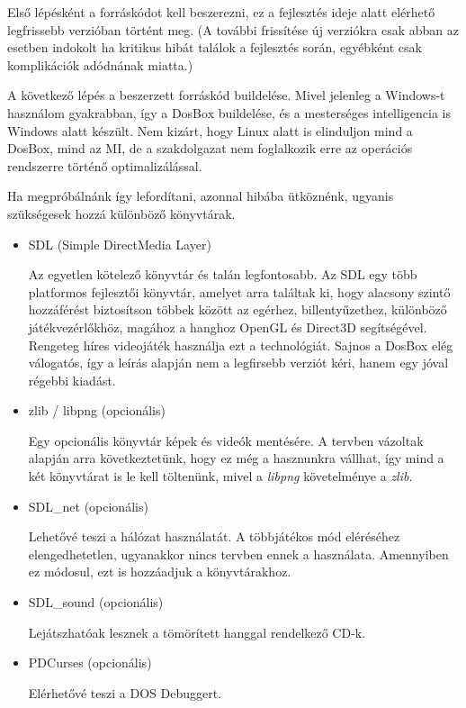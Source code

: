 

Első lépésként a forráskódot kell beszerezni, ez a fejlesztés ideje alatt elérhető legfrissebb verzióban történt meg. (A további frissítése új verziókra csak abban az esetben indokolt ha kritikus hibát találok a fejlesztés során, egyébként csak komplikációk adódnának miatta.)

A következő lépés a beszerzett forráskód buildelése. Mivel jelenleg a Windows-t használom gyakrabban, így a DosBox buildelése, és a mesterséges intelligencia is Windows alatt készült. Nem kizárt, hogy Linux alatt is elinduljon mind a DosBox, mind az MI, de a szakdolgazat nem foglalkozik erre az operációs rendszerre történő optimalizálással.

Ha megpróbálnánk így lefordítani, azonnal hibába ütköznénk, ugyanis szükségesek hozzá különböző könyvtárak.

\begin{itemize}

    \item SDL (Simple DirectMedia Layer)
    
    Az egyetlen kötelező könyvtár és talán legfontosabb. Az SDL egy több platformos fejlesztői könyvtár, amelyet arra találtak ki, hogy alacsony szintő hozzáférést biztosítson többek között az egérhez, billentyűzethez, különböző játékvezérlőkhöz, magához a hanghoz OpenGL és Direct3D segítségével. Rengeteg híres videojáték használja ezt a technológiát. Sajnos a DosBox elég válogatós, így a leírás alapján nem a legfirsebb verziót kéri, hanem egy jóval régebbi kiadást.
    \item zlib / libpng (opcionális)
    
    Egy opcionális könyvtár képek és videók mentésére. A tervben vázoltak alapján arra következtetünk, hogy ez még a hasznunkra vállhat, így mind a két könyvtárat is le kell töltenünk, mivel a \textit{libpng} követelménye a \textit{zlib}. 
    \item SDL\_net (opcionális)
    
    Lehetővé teszi a hálózat használatát. A többjátékos mód eléréséhez elengedhetetlen, ugyanakkor nincs tervben ennek a használata. Amennyiben ez módosul, ezt is hozzáadjuk a könyvtárakhoz.
    \item SDL\_sound (opcionális)
    
    Lejátszhatóak lesznek a tömörített hanggal rendelkező CD-k.
    \item PDCurses (opcionális)
    
    Elérhetővé teszi a DOS Debuggert.

\end{itemize}

